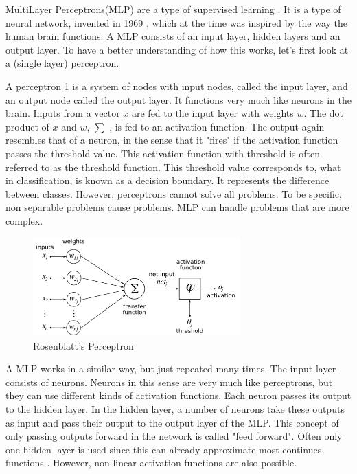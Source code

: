 MultiLayer Perceptrons(MLP) are a type of supervised learning \cite{michie1994machine}. It is a type of neural network, invented in 1969 \cite{minsky1969perceptions}, which at the time  was inspired by the way the human brain functions. A MLP consists of an input layer, hidden layers and an output layer. To have a better understanding of how this works, let's first look at a (single layer) perceptron\cite{rosenblatt1958perceptron}. 

A perceptron \ref{fig:perceptron} is a system of nodes with input nodes, called the input layer, and an output node called the output layer. It functions very much like neurons in the brain. Inputs from a vector $x$ are fed to the input layer with weights $w$. The dot product of $x$ and $w$, $\sum$ ,  is fed to an activation function. The output again resembles that of a neuron, in the sense that it "fires" if the activation function passes the threshold value. This activation function with threshold is often referred to as the threshold function. This threshold value corresponds to, what in classification, is known as a decision boundary. It represents the difference between classes. However, perceptrons cannot solve all problems. To be specific, non separable problems cause problems. MLP can handle problems that are more complex. \\
\begin{figure}[H]
    \includegraphics[width=80mm]{./img/perceptron.png}
    \caption{\footnotesize{Rosenblatt's Perceptron \cite{wikiPerceptronPNG}}}
    \label{fig:perceptron}
\end{figure}

A MLP works in a similar way, but just repeated many times. The input layer consists of neurons. Neurons in this sense are very much like perceptrons, but they can use different kinds of activation functions. Each neuron passes its output to the hidden layer. In the hidden layer, a number of neurons take these outputs as input and pass their output to the output layer of the MLP. This concept of only passing outputs forward in the network is called "feed forward". Often only one hidden layer is used since this can already approximate most continues functions \cite{cybenko1989approximation}. However, non-linear activation functions are also possible. 

